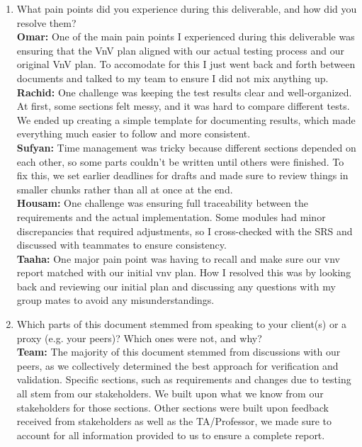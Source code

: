 \documentclass[12pt, titlepage]{article}
\begin{document}
\begin{enumerate}
  \item What pain points did you experience during this deliverable, and how
    did you resolve them? \\
    \textbf{Omar:} One of the main pain points I experienced during this deliverable was ensuring that the VnV plan aligned with our actual testing process and our original VnV plan. To accomodate for this I just went back and forth between documents and talked to my team to ensure I did not mix anything up. \\
    \textbf{Rachid:} One challenge was keeping the test results clear and well-organized. At first, some sections felt messy, and it was hard to compare different tests. We ended up creating a simple template for documenting results, which made everything much easier to follow and more consistent. \\
    \textbf{Sufyan:} Time management was tricky because different sections depended on each other, so some parts couldn't be written until others were finished. To fix this, we set earlier deadlines for drafts and made sure to review things in smaller chunks rather than all at once at the end.\\
    \textbf{Housam:} One challenge was ensuring full traceability between the requirements and the actual implementation. Some modules had minor discrepancies that required adjustments, so I cross-checked with the SRS and discussed with teammates to ensure consistency.\\
    \textbf{Taaha:} One major pain point was having to recall and make sure our vnv report matched with our initial vnv plan. How I resolved this was by looking back and reviewing our initial plan and discussing any questions with my group mates to avoid any misunderstandings.
    

  \item Which parts of this document stemmed from speaking to your client(s) or
  a proxy (e.g. your peers)? Which ones were not, and why? \\
    \textbf{Team:} The majority of this document stemmed from discussions with our peers, as we collectively determined the best approach for verification and validation. Specific sections, such as requirements and changes due to testing all stem from our stakeholders. We built upon what we know from our stakeholders for those sections. Other sections were built upon feedback received from stakeholders as well as the TA/Professor, we made sure to account for all information provided to us to ensure a complete report. 


\end{enumerate}
\end{document}
